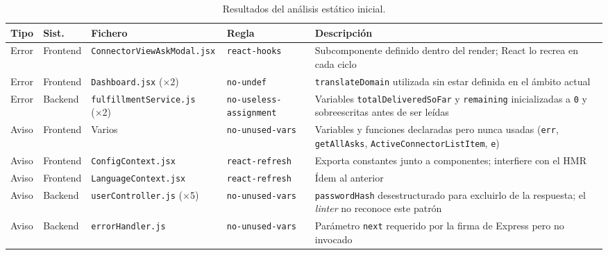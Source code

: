 \documentclass[11pt,oneside,spanish,listoffigures,listoftables]{tfgetsinf}
\begin{document}
\begin{table}[ht]
\centering
\caption[Resultados del análisis estático inicial]{Resultados del análisis estático inicial.}
\label{tab:eslint-primera}
\footnotesize
\renewcommand{\arraystretch}{1.3}
\begin{tabularx}{\textwidth}{%
  >{\raggedright\arraybackslash}p{1.0cm}%
  >{\raggedright\arraybackslash}p{1.4cm}%
  >{\raggedright\arraybackslash}p{3.0cm}%
  >{\raggedright\arraybackslash}p{2.8cm}%
  >{\raggedright\arraybackslash}X}
\toprule
\textbf{Tipo} & \textbf{Sist.} & \textbf{Fichero} & \textbf{Regla} & \textbf{Descripción} \\
\midrule
Error & Frontend & \texttt{ConnectorViewAsk\-Modal.jsx} & \texttt{react-hooks} & Subcomponente definido dentro del render; React lo recrea en cada ciclo \\
Error & Frontend & \texttt{Dashboard.jsx} (×2) & \texttt{no-undef} & \texttt{translateDomain} utilizada sin estar definida en el ámbito actual \\
Error & Backend & \texttt{fulfillmentService.js} (×2) & \mbox{\texttt{no-useless-}}\allowbreak\texttt{assignment} & Variables \texttt{totalDeliveredSoFar} y \texttt{remaining} inicializadas a \texttt{0} y sobreescritas antes de ser leídas \\
Aviso & Frontend & Varios & \texttt{no-unused-vars} & Variables y funciones declaradas pero nunca usadas (\texttt{err}, \texttt{getAllAsks}, \texttt{ActiveConnectorListItem}, \texttt{e}) \\
Aviso & Frontend & \texttt{ConfigContext.jsx} & \texttt{react-refresh} & Exporta constantes junto a componentes; interfiere con el HMR \\
Aviso & Frontend & \texttt{LanguageContext.jsx} & \texttt{react-refresh} & Ídem al anterior \\
Aviso & Backend & \texttt{userController.js} (×5) & \texttt{no-unused-vars} & \texttt{passwordHash} desestructurado para excluirlo de la respuesta; el \textit{linter} no reconoce este patrón \\
Aviso & Backend & \texttt{errorHandler.js} & \texttt{no-unused-vars} & Parámetro \texttt{next} requerido por la firma de Express pero no invocado \\
\bottomrule
\end{tabularx}
\end{table}
\end{document}
